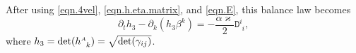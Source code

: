 \documentclass[
10pt, %
a4paper, %
oneside, %
headinclude,footinclude, %
BCOR5mm, %
]{scrartcl}
\newcommand{\sA}{\mathsmaller A}
\newcommand{\sB}{\mathsmaller B}
\newcommand{\pd}[1]{\partial_{#1}}
\newcommand{\mg}[1]{\kappa_{#1}}			%
\newcommand{\tetrsymbol}{h}
\newcommand{\itetrsymbol}{\eta}
\newcommand{\itetr}[2]{\itetrsymbol^{#1}_{\phantom{#1}#2}}
\newcommand{\tetr}[2]{\tetrsymbol^{#1}_{\phantom{#1}#2}}
\newcommand{\stress}[2]{s_{\ #1}^{#2}}
\newcommand{\detTetr}{\tetrsymbol}
\newcommand{\Dfin}[2]{\mathtt{D}_{\phantom{#2}#1}^{#2}}	%
\newcommand{\Hfin}[2]{\mathtt{H}_{#2#1}}	%
\newcommand{\Efin}[2]{\mathtt{E}^{#1}_{\phantom{#1}#2}}	%
\newcommand{\Ufin}{\mathtt{U}}
\newcommand{\Hfinn}[2]{\hat{\mathtt{H}}_{{#2}{#1}}}	%
\newcommand{\Efinn}[2]{\hat{\mathtt{E}}^{#1}_{\ #2}}	%
\newcommand{\Bfin}[2]{\mathtt{B}^{#1#2}}	%
\newcommand{\Bfinmix}[2]{\mathtt{B}^{#1}_{\phantom{#1}#2}}	%
\newcommand{\LCsymb}{\bm{\in}}    %
\newcommand{\shift}[1]{\beta^{#1}}
\begin{document}
   
After using \eqref{eqn.4vel}, \eqref{eqn.h.eta.matrix}, and \eqref{eqn.E}, this balance law becomes
\begin{equation}\label{eqn.h.PDE}
	\pd{t}\detTetr_3 - \pd{k}(\detTetr_3\shift{k} ) =-\frac{\alpha \varkappa}{2} \Dfin{i}{i},
\end{equation}
where $ \detTetr_3 =\det(\tetr{\sA}{k}) = \sqrt{\det(\gamma_{ij})} $.



%
%
%
\end{document}
